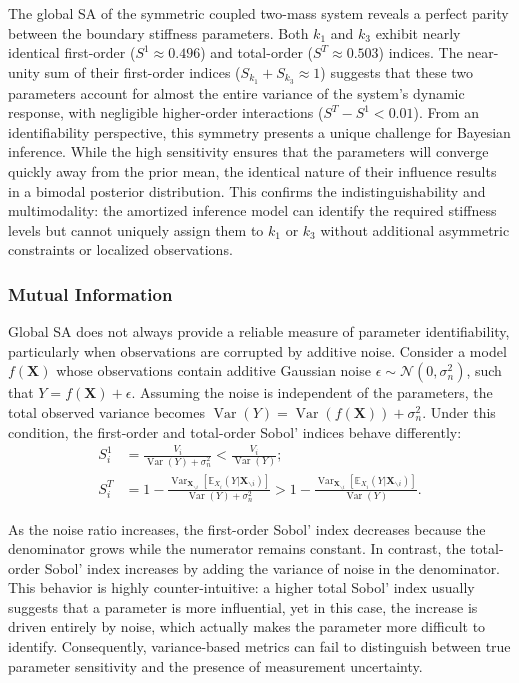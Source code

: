 The global \ac{SA} of the symmetric coupled two-mass system reveals a perfect parity between the boundary stiffness parameters. Both $k_1$ and $k_3$ exhibit nearly identical first-order ($S^1\approx 0.496$) and total-order ($S^T\approx 0.503$) indices. The near-unity sum of their first-order indices ($S_{k_1}+S_{k_3}\approx 1$) suggests that these two parameters account for almost the entire variance of the system's dynamic response, with negligible higher-order interactions ($S^T-S^1<0.01$). From an identifiability perspective, this symmetry presents a unique challenge for Bayesian inference. While the high sensitivity ensures that the parameters will converge quickly away from the prior mean, the identical nature of their influence results in a bimodal posterior distribution. This confirms the indistinguishability and multimodality: the amortized inference model can identify the required stiffness levels but cannot uniquely assign them to $k_1$ or $k_3$ without additional asymmetric constraints or localized observations.

\subsubsection{Mutual Information}
Global \ac{SA} does not always provide a reliable measure of parameter identifiability, particularly when observations are corrupted by additive noise. Consider a model $f(\boldsymbol{X})$ whose observations contain additive Gaussian noise $\epsilon\sim \mathcal{N}(0,\sigma_n^2)$, such that $Y=f(\boldsymbol{X})+\epsilon$. Assuming the noise is independent of the parameters, the total observed variance becomes $\operatorname{Var}(Y)=\operatorname{Var}(f(\boldsymbol{X}))+\sigma_n^2$. Under this condition, the first-order and total-order Sobol' indices behave differently:
\begin{align}
    S^1_i &= \frac{V_i}{\operatorname{Var}(Y)+\sigma^2_n} < \frac{V_i}{\operatorname{Var}(Y)};\\ 
    S^T_i &= 1-\frac{\operatorname{Var}_{\boldsymbol{X}_{\backslash i}}[\mathbb{E}_{X_i}(Y|\boldsymbol{X}_{\backslash i})]}{\operatorname{Var}(Y)+\sigma_n^2}>1-\frac{\operatorname{Var}_{\boldsymbol{X}_{\backslash i}}[\mathbb{E}_{X_i}(Y|\boldsymbol{X}_{\backslash i})]}{\operatorname{Var}(Y)}.
\end{align}

As the noise ratio increases, the first-order Sobol' index decreases because the denominator grows while the numerator remains constant. In contrast, the total-order Sobol' index increases by adding the variance of noise in the denominator. This behavior is highly counter-intuitive: a higher total Sobol' index usually suggests that a parameter is more influential, yet in this case, the increase is driven entirely by noise, which actually makes the parameter more difficult to identify. Consequently, variance-based metrics can fail to distinguish between true parameter sensitivity and the presence of measurement uncertainty. 

